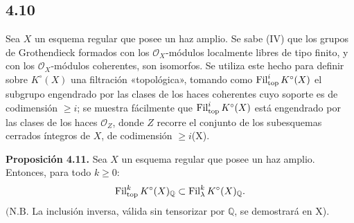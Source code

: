 \subsection*{4.10}

Sea \(X\) un esquema regular que posee un haz amplio. Se sabe (IV\qquad) que los grupos de Grothendieck formados con los \(\mathcal O_X\)-módulos localmente libres de tipo finito, y con los \(\mathcal O_X\)-módulos coherentes, son isomorfos. Se utiliza este hecho para definir sobre \(K^\circ(X)\) una filtración «topológica», tomando como \(\operatorname{Fil}^i_{\mathrm{top}}K^\circ(X)\) el subgrupo engendrado por las clases de los haces coherentes cuyo soporte es de codimensión \(\ge i\); se muestra fácilmente que \(\operatorname{Fil}^i_{\mathrm{top}}K^\circ(X)\) está engendrado por las clases de los haces \(\mathcal O_Z\), donde \(Z\) recorre el conjunto de los subesquemas cerrados íntegros de \(X\), de codimensión \(\ge i\)(X\qquad).

\textbf{Proposición 4.11.} Sea \(X\) un esquema regular que posee un haz amplio. Entonces, para todo \(k\ge0\):
\[
  \operatorname{Fil}_{\mathrm{top}}^kK^\circ(X)_{\mathbb Q}
  \subset
  \operatorname{Fil}_\lambda^kK^\circ(X)_{\mathbb Q}.
\]
\((\mathrm{N.B.}\) La inclusión inversa, válida sin tensorizar por \(\mathbb Q\), se demostrará en X\qquad).


